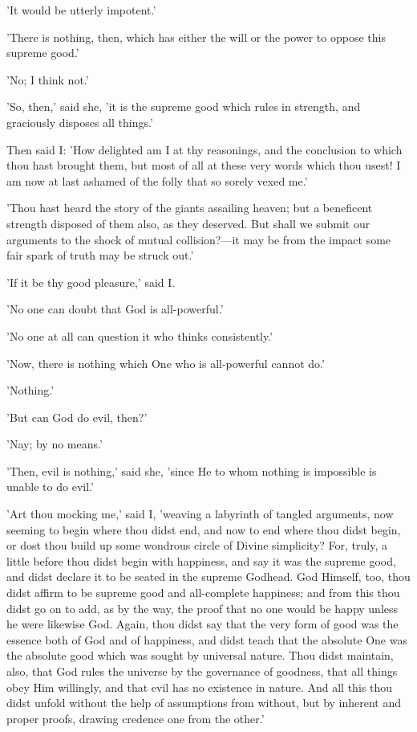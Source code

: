 'It would be utterly impotent.'

'There is nothing, then, which has either the will or the power to
oppose this supreme good.'

'No; I think not.'

'So, then,' said she, 'it is the supreme good which rules in strength,
and graciously disposes all things.'

Then said I: 'How delighted am I at thy reasonings, and the conclusion
to which thou hast brought them, but most of all at these very words
which thou usest! I am now at last ashamed of the folly that so sorely
vexed me.'

'Thou hast heard the story of the giants assailing heaven; but a
beneficent strength disposed of them also, as they deserved. But shall
we submit our arguments to the shock of mutual collision?—it may be
from the impact some fair spark of truth may be struck out.'

'If it be thy good pleasure,' said I.

'No one can doubt that God is all-powerful.'

'No one at all can question it who thinks consistently.'

'Now, there is nothing which One who is all-powerful cannot do.'

'Nothing.'

'But can God do evil, then?'

'Nay; by no means.'

'Then, evil is nothing,' said she, 'since He to whom nothing is
impossible is unable to do evil.'

'Art thou mocking me,' said I, 'weaving a labyrinth of tangled
arguments, now seeming to begin where thou didst end, and now to end
where thou didst begin, or dost thou build up some wondrous circle of
Divine simplicity? For, truly, a little before thou didst begin with
happiness, and say it was the supreme good, and didst declare it to be
seated in the supreme Godhead. God Himself, too, thou didst affirm to be
supreme good and all-complete happiness; and from this thou didst go on
to add, as by the way, the proof that no one would be happy unless he
were likewise God. Again, thou didst say that the very form of good was
the essence both of God and of happiness, and didst teach that the
absolute One was the absolute good which was sought by universal nature.
Thou didst maintain, also, that God rules the universe by the governance
of goodness, that all things obey Him willingly, and that evil has no
existence in nature. And all this thou didst unfold without the help of
assumptions from without, but by inherent and proper proofs, drawing
credence one from the other.'


